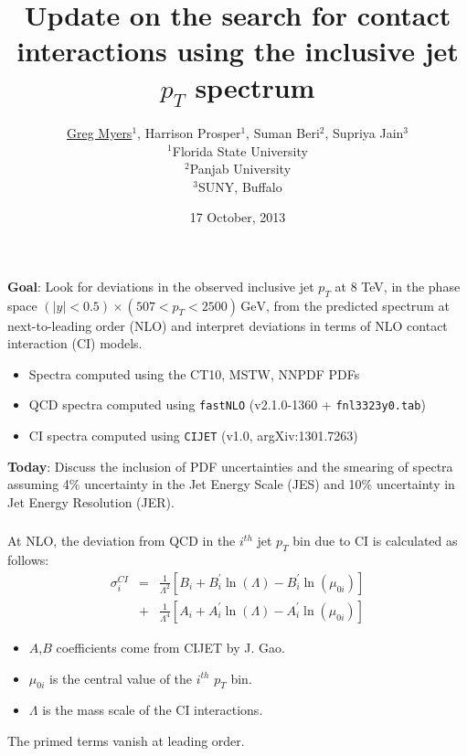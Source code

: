 \documentclass{beamer}
\title{Update on the search for contact interactions using the inclusive jet $p_T$ spectrum}
\author{ \underline{Greg Myers}$^{1}$, Harrison Prosper$^{1}$, Suman Beri$^{2}$, Supriya Jain$^{3}$ \\ $^{1}$Florida State University \\$^{2}$Panjab University \\$^{3}$SUNY, Buffalo}
\date{17 October, 2013}
\newcommand\BLUE[1]{\textcolor[rgb]{0,0,0.85}{\textbf{#1}}}
\begin{document}
\frame{\titlepage}

\begin{frame}
	\frametitle{}
	\BLUE{Goal}: Look for deviations in the observed inclusive jet $p_T$ at 8 TeV, in the phase space $(|y| < 0.5) \times (507 < p_T <  2500) \, \textrm{GeV}$, from the predicted spectrum at next-to-leading order (NLO) and interpret deviations in terms of NLO contact interaction (CI) models.\\
	\begin{itemize}
	\item Spectra computed using the CT10, MSTW, NNPDF PDFs
	\item QCD spectra computed using {\tt fastNLO} (v2.1.0-1360 + {\tt fnl3323y0.tab})
	\item CI spectra computed using {\tt CIJET} (v1.0, argXiv:1301.7263)
	\end{itemize}
	\medskip
	\BLUE{Today}:
Discuss the inclusion of PDF uncertainties and the smearing of spectra assuming 4\% uncertainty in the Jet Energy Scale (JES) and 10\% uncertainty in Jet Energy Resolution (JER).
\end{frame}

\begin{frame}
	\frametitle{}
	At NLO, the deviation from QCD in the $i^{th}$  jet $p_{T}$ bin due to CI is calculated as follows:
\begin{eqnarray}
\sigma^{CI}_{i}  & = &  \frac{1}{\Lambda^{2}}\left[ B_i + B_{i}^{\prime}\ln\left( \Lambda \right) - B_{i}^{\prime}\ln\left( \mu_{0i} \right) \right] \nonumber\\
			& + &  \frac{1}{\Lambda^{4}}\left[ A_i + A_{i}^{\prime}\ln\left( \Lambda \right) - A_{i}^{\prime}\ln\left( \mu_{0i} \right) \right] \nonumber
\end{eqnarray}
	
	\begin{itemize}
		\item $A$,$B$ coefficients come from CIJET by J. Gao.
		\item $\mu_{0i}$ is the central value of the $i^{th}$  $p_T$ bin.
		\item $\Lambda$ is the mass scale of the CI interactions.
	\end{itemize}

\bigskip
The primed terms vanish at leading order.
\end{frame}
\end{document}
